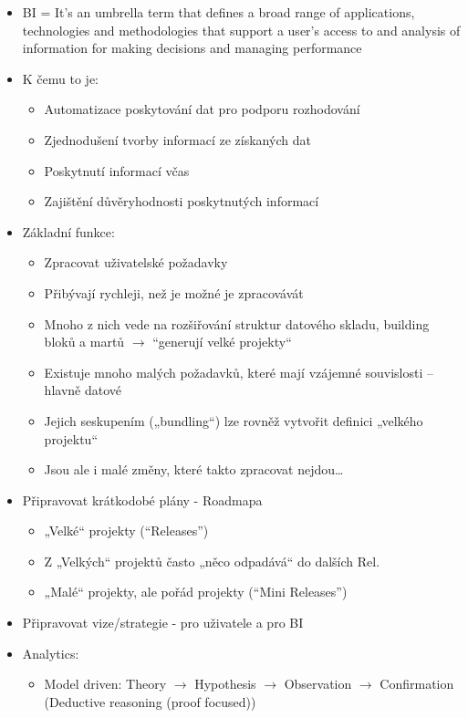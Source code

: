 \documentclass[a4paper,hidelinks]{article}
\begin{document}
\begin{itemize}
    \item BI = It's an umbrella term that defines a broad range of applications, technologies and methodologies that support a user's access to and analysis of information for making decisions and managing performance
    \item K čemu to je:
    \begin{itemize}
        \item Automatizace poskytování dat pro podporu rozhodování
        \item Zjednodušení tvorby informací ze získaných dat
        \item Poskytnutí informací včas
        \item Zajištění důvěryhodnosti poskytnutých informací  
    \end{itemize}
    \item Základní funkce:
    \begin{itemize}
        \item Zpracovat uživatelské požadavky
        \item Přibývají rychleji, než je možné je zpracovávát
        \item Mnoho z nich vede na rozšiřování struktur datového skladu, building bloků a martů $\to$ “generují velké projekty“
        \item Existuje mnoho malých požadavků, které mají vzájemné souvislosti – hlavně datové
        \item Jejich seskupením („bundling“) lze rovněž vytvořit definici „velkého projektu“
        \item Jsou ale i malé změny, které takto zpracovat nejdou…
    \end{itemize}
    \item Připravovat krátkodobé plány - Roadmapa
    \begin{itemize}
        \item „Velké“ projekty (“Releases”)
        \item Z „Velkých“ projektů často „něco odpadává“ do dalších Rel.
        \item „Malé“ projekty, ale pořád projekty (“Mini Releases”)  
    \end{itemize}
    \item Připravovat vize/strategie - pro uživatele a pro BI
    \item Analytics:
    \begin{itemize}
        \item Model driven: Theory $\to$ Hypothesis $\to$ Observation $\to$ Confirmation (Deductive reasoning (proof focused))

\end{itemize}
\end{itemize}
\end{document}
